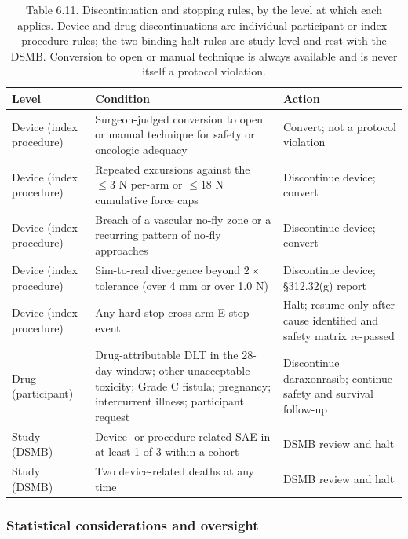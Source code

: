 \begin{table}[t]
\caption{Table 6.11. Discontinuation and stopping rules, by the level at which each
applies. Device and drug discontinuations are individual-participant or
index-procedure rules; the two binding halt rules are study-level and rest with the
DSMB. Conversion to open or manual technique is always available and is never itself
a protocol violation.}
\label{tab:sec06-stopping}
\centering
\begin{tabularx}{\textwidth}{L{2.6cm} Y L{3.0cm}}
\toprule
\textbf{Level} & \textbf{Condition} & \textbf{Action} \\
\midrule
Device (index procedure) & Surgeon-judged conversion to open or manual technique for safety or oncologic adequacy & Convert; not a protocol violation \\
Device (index procedure) & Repeated excursions against the $\leq 3$ N per-arm or $\leq 18$ N cumulative force caps & Discontinue device; convert \\
Device (index procedure) & Breach of a vascular no-fly zone or a recurring pattern of no-fly approaches & Discontinue device; convert \\
Device (index procedure) & Sim-to-real divergence beyond $2\times$ tolerance (over 4 mm or over 1.0 N) & Discontinue device; \S 312.32(g) report \\
Device (index procedure) & Any hard-stop cross-arm E-stop event & Halt; resume only after cause identified and safety matrix re-passed \\
Drug (participant) & Drug-attributable DLT in the 28-day window; other unacceptable toxicity; Grade C fistula; pregnancy; intercurrent illness; participant request & Discontinue daraxonrasib; continue safety and survival follow-up \\
Study (DSMB) & Device- or procedure-related SAE in at least 1 of 3 within a cohort & DSMB review and halt \\
Study (DSMB) & Two device-related deaths at any time & DSMB review and halt \\
\bottomrule
\end{tabularx}
\end{table}

\subsubsection*{Statistical considerations and oversight}


